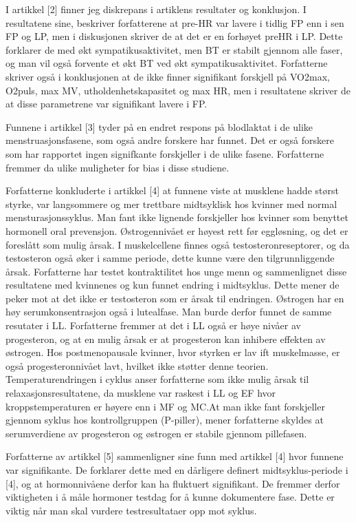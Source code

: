 \documentclass[
  letterpaper,
  DIV=11,
  numbers=noendperiod]{scrreprt}
\begin{document}
I artikkel {[}2{]} finner jeg diskrepans i artiklens resultater og
konklusjon. I resultatene sine, beskriver forfatterene at pre-HR var
lavere i tidlig FP enn i sen FP og LP, men i diskusjonen skriver de at
det er en forhøyet preHR i LP. Dette forklarer de med økt
sympatikusaktivitet, men BT er stabilt gjennom alle faser, og man vil
også forvente et økt BT ved økt sympatikusaktivitet. Forfatterne skriver
også i konklusjonen at de ikke finner signifikant forskjell på VO2max,
O2puls, max MV, utholdenhetskapasitet og max HR, men i resultatene
skriver de at disse parametrene var signifikant lavere i FP.

Funnene i artikkel {[}3{]} tyder på en endret respons på blodlaktat i de
ulike menstruasjonsfasene, som også andre forskere har funnet. Det er
også forskere som har rapportet ingen signifkante forskjeller i de ulike
fasene. Forfatterne fremmer da ulike muligheter for bias i disse
studiene.

Forfatterne konkluderte i artikkel {[}4{]} at funnene viste at musklene
hadde størst styrke, var langsommere og mer trettbare midtsyklisk hos
kvinner med normal mensturasjonssyklus. Man fant ikke lignende
forskjeller hos kvinner som benyttet hormonell oral prevensjon.
Østrogennivået er høyest rett før eggløsning, og det er foreslått som
mulig årsak. I muskelcellene finnes også testosteronreseptorer, og da
testosteron også øker i samme periode, dette kunne være den
tilgrunnliggende årsak. Forfatterne har testet kontraktilitet hos unge
menn og sammenlignet disse resultatene med kvinnenes og kun funnet
endring i midtsyklus. Dette mener de peker mot at det ikke er
testosteron som er årsak til endringen. Østrogen har en høy
serumkonsentrasjon også i lutealfase. Man burde derfor funnet de samme
resutater i LL. Forfatterne fremmer at det i LL også er høye nivåer av
progesteron, og at en mulig årsak er at progesteron kan inhibere
effekten av østrogen. Hos postmenopausale kvinner, hvor styrken er lav
ift muskelmasse, er også progesteronnivået lavt, hvilket ikke støtter
denne teorien. Temperaturendringen i cyklus anser forfatterne som ikke
mulig årsak til relaxasjonsresultatene, da musklene var raskest i LL og
EF hvor kroppstemperaturen er høyere enn i MF og MC.At man ikke fant
forskjeller gjennom syklus hos kontrollgruppen (P-piller), mener
forfatterne skyldes at serumverdiene av progesteron og østrogen er
stabile gjennom pillefasen.

Forfatterne av artikkel {[}5{]} sammenligner sine funn med artikkel
{[}4{]} hvor funnene var signifikante. De forklarer dette med en
dårligere definert midtsyklus-periode i {[}4{]}, og at hormonnivåene
derfor kan ha fluktuert signifikant. De fremmer derfor viktigheten i å
måle hormoner testdag for å kunne dokumentere fase. Dette er viktig når
man skal vurdere testresultataer opp mot syklus.
\end{document}
